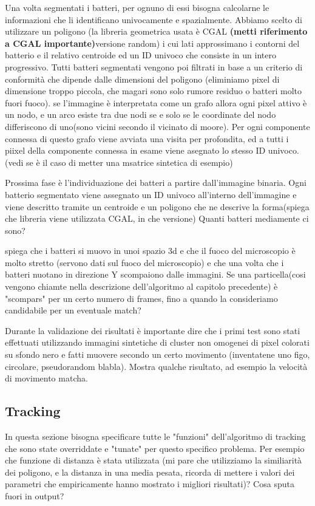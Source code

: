 \documentclass[conference]{IEEEtran}
\begin{document}
 Una volta segmentati  i batteri, per ognuno di essi bisogna calcolarne le informazioni che li identificano univocamente e spazialmente. Abbiamo scelto di utilizzare un poligono (la libreria geometrica usata è CGAL \textbf{(metti riferimento a CGAL importante)}versione random) i cui lati approssimano i contorni del batterio e il relativo centroide ed un ID  univoco che consiste in un intero progressivo. 
 Tutti batteri segmentati vengono poi filtrati in base a un criterio di conformità che dipende dalle dimensioni del poligono (eliminiamo pixel di dimensione troppo piccola, che magari sono solo rumore residuo o batteri molto fuori fuoco). se l'immagine è interpretata come un grafo allora ogni pixel attivo è un nodo, e  un arco esiste tra due nodi se e solo se le coordinate del nodo differiscono di uno(sono vicini secondo il vicinato di moore). Per ogni componente connessa di questo grafo viene avviata una visita per profondita, ed a tutti i piixel della componente connessa in esame viene asegnato lo stesso ID univoco. (vedi se è il caso di metter una msatrice sintetica di esempio)

Prossima fase è l'individuazione dei batteri a partire dall'immagine binaria. Ogni batterio segmentato viene assegnato un ID univoco all'interno dell'immagine e viene descritto tramite un centroide e un poligono che ne descrive la forma(spiega che libreria viene utilizzata CGAL, in che versione)
Quanti batteri mediamente ci sono? 


spiega che i batteri si muovo in unoi spazio 3d e che il fuoco del microscopio è molto stretto (servono dati sul fuoco del microscopio) e che una volta che i batteri nuotano in direzione Y scompaiono dalle immagini. 
Se una particella(cosi vengono chiamte nella descrizione dell'algoritmo al capitolo precedente) è "scompars" per un certo numero di frames, fino a quando la consideriamo candidabile per un eventuale match?

Durante la validazione dei risultati è importante dire che i primi test sono stati effettuati utilizzando immagini  sintetiche di cluster non omogenei di pixel colorati su sfondo nero e fatti muovere secondo un certo movimento  (inventatene uno figo, circolare, pseudorandom blabla). 
Mostra qualche risultato, ad esempio la velocità di movimento matcha. 
\subsection{Tracking}
In questa sezione bisogna specificare tutte le "funzioni" dell'algoritmo di tracking che sono state overriddate e "tunate" per questo specifico problema. Per esempio che funzione di distanza è stata utilizzata (mi pare che utilizziamo la similiarità dei poligono, e la distanza in una media pesata, ricorda di mettere i valori dei parametri che empiricamente hanno mostrato i migliori risultati)?
Cosa sputa fuori in output?  
\end{document}
